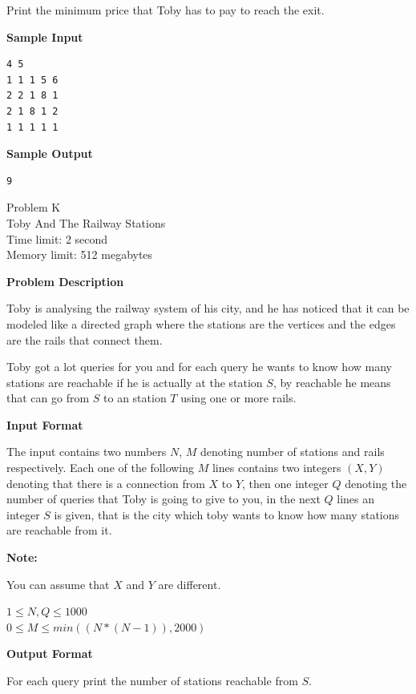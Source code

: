 \documentclass[11pt]{article}
\begin{document}
Print the minimum price that Toby has to pay to reach the exit.

\textbf{\large Sample Input}

\begin{verbatim}
4 5
1 1 1 5 6
2 2 1 8 1
2 1 8 1 2
1 1 1 1 1
\end{verbatim}

\textbf{\large Sample Output}

\begin{verbatim}
9
\end{verbatim}

\newpage

        \begin{center}
            {\LARGE Problem K}\\
            {\Large Toby And The Railway Stations}\\
            {Time limit: 2 second}\\
            {Memory limit: 512 megabytes}
        \end{center}\textbf{\large Problem Description}

Toby is analysing the railway system of his city, and he has noticed that it can
be modeled like a directed graph where the stations are the vertices and the edges
are the rails that connect them.

Toby got a lot queries for you and for each query he wants to know how many
stations are reachable if he is actually at the station $S$, by reachable he
means that can go from $S$ to an station $T$ using one or more rails.

\textbf{\large Input Format}

The input contains two numbers $N$, $M$ denoting number of stations and rails
respectively. Each one of the following $M$ lines contains two integers $(X, Y)$
denoting that there is a connection from $X$ to $Y$, then one integer $Q$
denoting the number of queries that Toby is going to give to you, in the next $Q$
lines an integer $S$ is given, that is the city which toby wants to know how
many stations are reachable from it.

\textbf{\large Note:}

You can assume that $X$ and $Y$ are different.

$1 \le N, Q \le 1000$ \\
$0 \le M \le min((N * (N - 1)), 2000) $ %

\textbf{\large Output Format}

For each query print the number of stations reachable from $S$.
\end{document}

